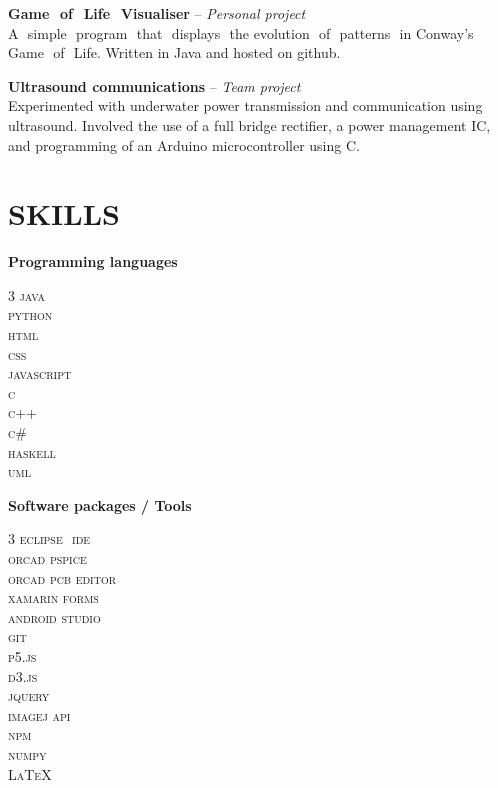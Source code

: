 \documentclass[paper=a4,fontsize=11pt]{scrartcl} %
\newcommand{\sepspace}{\vspace*{1em}}		%
\newcommand{\NewPart}[1]{\section*{\uppercase{\textcolor{PARTCOLOR}{#1}}}}
\newcommand{\ProjectEntry}[3]{
	\noindent
	\textbf{#1} -- \textit{#2} \\
	\textcolor{DESCOLOR}{#3}
	\sepspace
}
\newcommand{\SkillEntry}[2]{
	\noindent
	\textbf{#1}
	\begin{multicols}{3}
	\noindent
	\textcolor{DESCOLOR}{\textsc{#2}}
	\end{multicols}
	\sepspace
}
\begin{document}
\ProjectEntry{Game​ ​ of​ ​ Life​ ​ Visualiser}{Personal project}{A​ ​ simple​ ​ program​ ​ that​ ​ displays​ ​ the​ ​ evolution​ ​ of​ ​ patterns​ ​ in Conway’s​ ​ Game​ ​ of​ ​ Life. Written in Java and hosted on github.}

\ProjectEntry{Ultrasound communications}{Team project}{Experimented with underwater power transmission and communication using ultrasound. Involved the use of a full bridge rectifier, a power management IC, and programming of an Arduino microcontroller using C.}

\NewPart{Skills}
\SkillEntry{Programming languages}{java\\​python\\​html\\​css\\​javascript\\​c\\c++\\c\#\\​haskell\\uml}

\SkillEntry{Software packages / Tools}{eclipse​ ​ ide\\​orcad​ pspice\\​orcad ​pcb ​editor\\​xamarin forms\\​android​ studio\\​git\\​p5.js\\d3.js\\jquery\\imagej api\\npm\\numpy\\\LaTeX}
\end{document}
